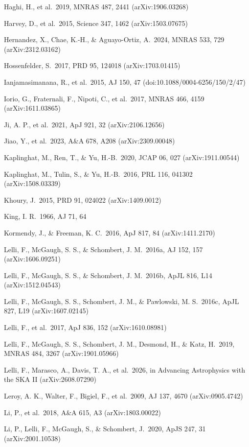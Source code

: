 \documentclass[
  10pt,
]{article}
\begin{document}
{\begin{list}{}{\setlength{\leftmargin}{1.5em}\setlength{\itemindent}{-1.5em}\setlength{\itemsep}{1pt}\setlength{\parsep}{0pt}}
\item Haghi, H., et al.\ 2019, MNRAS 487, 2441 (arXiv:1906.03268)
\item Harvey, D., et al.\ 2015, Science 347, 1462 (arXiv:1503.07675)
\item Hernandez, X., Chae, K.-H., \& Aguayo-Ortiz, A.\ 2024, MNRAS 533, 729 (arXiv:2312.03162)
\item Hossenfelder, S.\ 2017, PRD 95, 124018 (arXiv:1703.01415)
\item Ianjamasimanana, R., et al.\ 2015, AJ 150, 47 (doi:10.1088/0004-6256/150/2/47)
\item Iorio, G., Fraternali, F., Nipoti, C., et al.\ 2017, MNRAS 466, 4159 (arXiv:1611.03865)
\item Ji, A. P., et al.\ 2021, ApJ 921, 32 (arXiv:2106.12656)
\item Jiao, Y., et al.\ 2023, A\&A 678, A208 (arXiv:2309.00048)
\item Kaplinghat, M., Ren, T., \& Yu, H.-B.\ 2020, JCAP 06, 027 (arXiv:1911.00544)
\item Kaplinghat, M., Tulin, S., \& Yu, H.-B.\ 2016, PRL 116, 041302 (arXiv:1508.03339)
\item Khoury, J.\ 2015, PRD 91, 024022 (arXiv:1409.0012)
\item King, I. R.\ 1966, AJ 71, 64
\item Kormendy, J., \& Freeman, K. C.\ 2016, ApJ 817, 84 (arXiv:1411.2170)
\item Lelli, F., McGaugh, S. S., \& Schombert, J. M.\ 2016a, AJ 152, 157 (arXiv:1606.09251)
\item Lelli, F., McGaugh, S. S., \& Schombert, J. M.\ 2016b, ApJL 816, L14 (arXiv:1512.04543)
\item Lelli, F., McGaugh, S. S., Schombert, J. M., \& Pawlowski, M. S.\ 2016c, ApJL 827, L19 (arXiv:1607.02145)
\item Lelli, F., et al.\ 2017, ApJ 836, 152 (arXiv:1610.08981)
\item Lelli, F., McGaugh, S. S., Schombert, J. M., Desmond, H., \& Katz, H.\ 2019, MNRAS 484, 3267 (arXiv:1901.05966)
\item Lelli, F., Marasco, A., Davis, T. A., et al.\ 2026, in Advancing Astrophysics with the SKA II (arXiv:2608.07290)
\item Leroy, A. K., Walter, F., Bigiel, F., et al.\ 2009, AJ 137, 4670 (arXiv:0905.4742)
\item Li, P., et al.\ 2018, A\&A 615, A3 (arXiv:1803.00022)
\item Li, P., Lelli, F., McGaugh, S., \& Schombert, J.\ 2020, ApJS 247, 31 (arXiv:2001.10538)

\end{list}}
\end{document}

